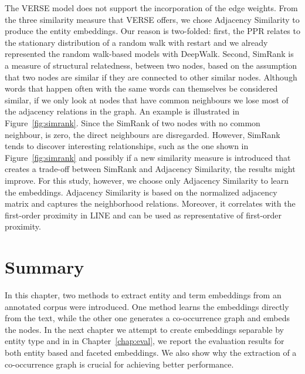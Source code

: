 \noindent
The VERSE model does not support the incorporation of the edge weights. From the three similarity measure that VERSE offers, we chose Adjacency Similarity to produce the entity embeddings. Our reason is two-folded: first, the PPR relates to the stationary distribution of a random walk with restart and we already represented the random walk-based models with DeepWalk. Second, SimRank is a measure of structural relatedness, between two nodes, based on the assumption that two nodes are similar if they are connected to other similar nodes. Although words that happen often with the same words can themselves be considered similar, if we only look at nodes that have common neighbours we lose most of the adjacency relations in the graph. An example is illustrated in Figure~\ref{fig:simrank}. Since the SimRank of two nodes with no common neighbour, is zero, the direct neighbours are disregarded. However, SimRank tends to discover interesting relationships, such as the one shown in Figure~\ref{fig:simrank} and possibly if a new similarity measure is introduced that creates a trade-off between SimRank and Adjacency Similarity, the results might improve. For this study, however, we choose only Adjacency Similarity to learn the embeddings. Adjacency Similarity is based on the normalized adjacency matrix and captures the neighborhood relations. Moreover, it correlates with the first-order proximity in LINE and can be used as representative of first-order proximity. 
\section{Summary}\label{sec:entity_summary}
In this chapter, two methods to extract entity and term embeddings from an annotated corpus were introduced. One method learns the embeddings directly from the text, while the other one generates a co-occurrence graph and embeds the nodes. In the next chapter we attempt to create embeddings separable by entity type and in in Chapter~\ref{chap:eval}, we report the evaluation results for both entity based and faceted embeddings. We also show why the extraction of a co-occurrence graph is crucial for achieving better performance. 

